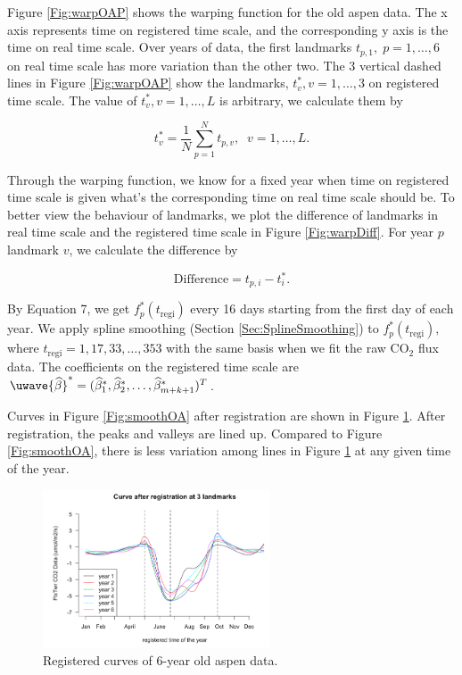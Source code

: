 \documentclass{article}
\begin{document}
Figure \ref{Fig:warpOAP} shows the warping function for the old aspen data. 
The x axis represents time on registered time scale, and the corresponding y axis is the time on real time scale.
Over years of data, the first landmarks $t_{p,1},\;p=1,\dots,6$ on real time scale has more variation than the other two. The 3 vertical dashed lines in Figure \ref{Fig:warpOAP} show the landmarks, $t_v^{*}, v=1,\dots,3$ on registered time scale. The value of $t_v^{*}, v=1,\dots,L$ is arbitrary, we calculate them by

\begin{equation}
t_v^{*} = \frac{1}{N}\sum_{p=1}^{N} t_{p,v},\;\;v=1,\dots,L.
\end{equation}

Through the warping function, we know for a fixed year when time on registered time scale is given what's the corresponding time on real time scale should be. To better view the behaviour of landmarks, we plot the difference of landmarks in real time scale and the registered time scale in Figure \ref{Fig:warpDiff}. For year $p$ landmark $v$, we calculate the difference by

\begin{equation}
\textrm{Difference} = t_{p,i} - t_{i}^{*}.
\end{equation}

By Equation 7, we get $f^{*}_p(t_{\textrm{regi}})$ every 16 days starting from the first day of each year. We apply spline smoothing (Section \ref{Sec:SplineSmoothing}) to $f^{*}_p(t_{\textrm{regi}}),$ where $t_{\textrm{regi}}=1,17,33,\dots,353$ with the same basis when we fit the raw CO$_2$ flux data. The coefficients on the registered time scale are $\uwave{\widehat{\beta}}^{*} = (\widehat{\beta}^{*}_1,\widehat{\beta}^{*}_2,\dots,\widehat{\beta}^{*}_{m+k+1})^{T}$.  

Curves in Figure \ref{Fig:smoothOA} after registration are shown in Figure \ref{Fig:regiOA}. After registration, the peaks and valleys are lined up. Compared to Figure \ref{Fig:smoothOA}, there is less variation among lines in Figure \ref{Fig:regiOA} at any given time of the year.

\begin{figure}[!ht]
\centering
\includegraphics[width=0.6\textwidth]{Regi1.png}
\caption{Registered curves of 6-year old aspen data.}\label{Fig:regiOA}
\end{figure}
\end{document}
